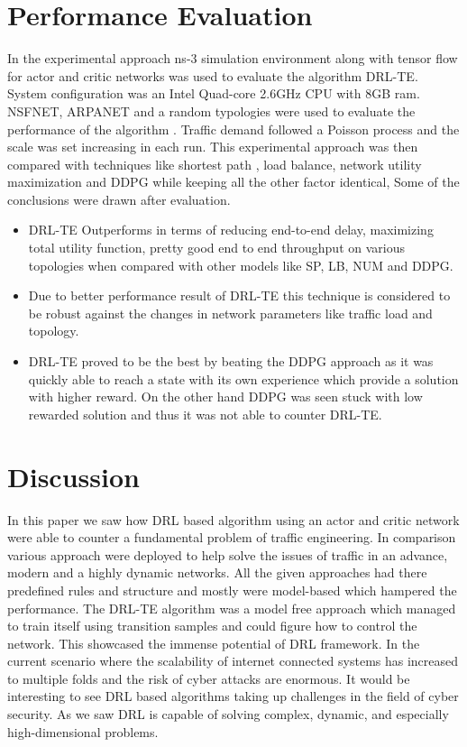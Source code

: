 \section{ Performance Evaluation}
\label{sec:pet-peeves}
In the experimental approach ns-3 simulation environment along with tensor flow for actor and critic networks was used to evaluate the algorithm DRL-TE. System configuration \cite{Exp:_DRLapproach} was an Intel Quad-core 2.6GHz CPU with 8GB ram. NSFNET, ARPANET and a random typologies were used to evaluate the performance of the algorithm \cite{Exp:_DRLapproach}. Traffic demand followed a Poisson process and the scale was set increasing in each run. This experimental approach was then compared with techniques like shortest path , load balance, network utility maximization and DDPG
while keeping all the other factor identical,
Some of the conclusions were drawn after evaluation.
\begin{itemize}
\item DRL-TE \cite{Exp:_DRLapproach} Outperforms in terms of reducing end-to-end delay, maximizing total utility function, pretty good end to end throughput on various topologies when compared with other models like SP, LB, NUM and DDPG. 
\item Due to better performance result of DRL-TE \cite{Exp:_DRLapproach} this technique is considered to be robust against the changes in network parameters like traffic load and topology.
\item DRL-TE \cite{Exp:_DRLapproach} proved to be the best by beating the DDPG approach as it was quickly able to reach a state with its own experience which provide a solution with higher reward. On the other hand DDPG was seen stuck with low rewarded solution and thus it was not able to counter DRL-TE. 
\end{itemize}

\section{Discussion}
\label{sec:dis}

In this paper we saw how DRL based algorithm using an actor and critic network were able to counter a fundamental problem of traffic engineering. In comparison various approach were deployed to help solve the issues of traffic in an advance, modern and a highly dynamic networks. All the given approaches had there predefined rules and structure and mostly were model-based which hampered the performance. The DRL-TE algorithm was a model free approach which managed to train itself using transition samples and could figure how to control the network. This showcased the immense potential of DRL framework. 
In the current scenario where the scalability of internet connected systems has increased to multiple folds and the risk of cyber attacks are enormous. It would be interesting to see DRL based algorithms taking up challenges in the field of cyber security. As we saw DRL is capable of solving complex, dynamic, and especially high-dimensional problems.

